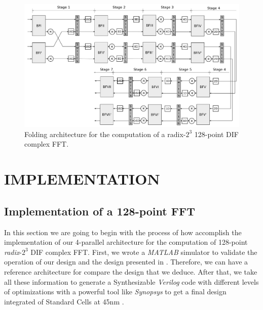 \documentclass[journal,comsoc]{IEEEtran}
\begin{document}
\begin{figure} 
	\centering
	\includegraphics[width=0.8\linewidth]{Diagramas/folding-128.png}
	\caption{Folding architecture for the computation of a radix-$2^3$ 128-point DIF complex FFT.}
	\label{fig:folding_128}
\end{figure}




\section{IMPLEMENTATION}

\subsection{Implementation of a 128-point FFT}
In this section we are going to begin with the process of how accomplish the implementation of our 4-parallel architecture for the computation of 128-point \textit{radix}-$2^3$ DIF complex FFT.
First, we wrote a \textit{MATLAB} simulator to validate the operation of our design and the design presented in \cite{garrido_pipelined_2013,garrido_feedforward_2018}. Therefore, we can have a reference architecture for compare the design that we deduce. After that, we take all these information to generate a Synthesizable \textit{Verilog} code with different levels of optimizations with a powerful tool like \textit{Synopsys} to get a final design integrated of Standard Cells at 45nm \cite{freePdk}.

\end{document}

